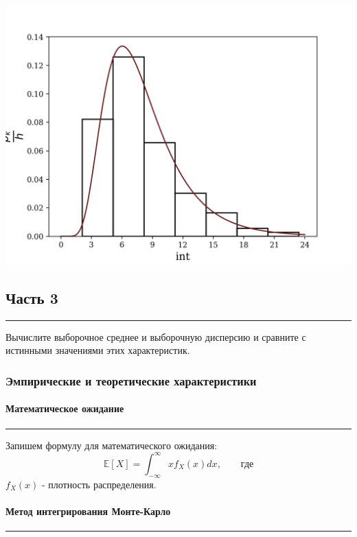 \documentclass[a4paper, 14pt]{extarticle}
\begin{document}
\includegraphics[width=1\textwidth]{histXpdf}

\subsection{Часть 3}\vspace{-20pt}\rule{\linewidth}{0.1mm}

Вычислите выборочное среднее и выборочную дисперсию и сравните с 
истинными значениями этих характеристик.

\subsubsection{Эмпирические и теоретические характеристики}

\paragraph{Математическое ожидание}\vspace{-20pt}\rule{\linewidth}{0.1mm}

Запишем формулу для математического ожидания:
\begin{equation}
  \mathbb{E}[X] = \int_{-\infty}^{\infty} x f_X (x) dx, \qquad \text{где}
\end{equation}
$f_X (x)$ - плотность распределения.\\ 

\paragraph{Метод интегрирования Монте-Карло}\vspace{-20pt}\rule{\linewidth}{0.1mm}
\end{document}

